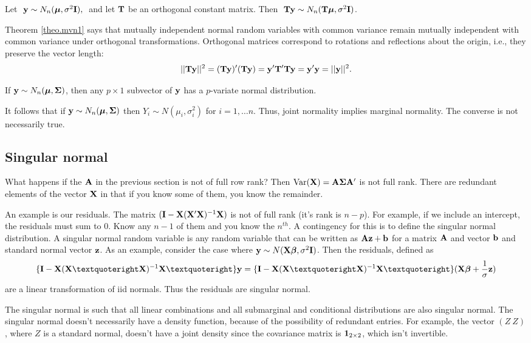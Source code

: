 \bstheo
\label{theo.mvn1}
Let $\ {\bf y}\sim N_n(\mbox{\boldmath $\mu$},\sigma^2 \mathbf{I}),\ $ and let $\mathbf{T}$ be an
orthogonal constant matrix.  Then $\ \mathbf{T}\mathbf{y}\sim
N_n(\mathbf{T}\mbox{\boldmath $\mu$},\sigma^2\mathbf{I})$.
\etheo


Theorem \ref{theo.mvn1} says that mutually independent normal random
variables with common variance remain mutually independent with common
variance under orthogonal transformations.  Orthogonal matrices
correspond to rotations and reflections about the origin, i.e., they
preserve the vector length:
$$||\mathbf{T}\mathbf{y}||^2=(\mathbf{T}\mathbf{y})'(\mathbf{T}\mathbf{y}) =
\mathbf{y}'\mathbf{T}'\mathbf{T}\mathbf{y}=\mathbf{y}'\mathbf{y}=||\mathbf{y}||^2.$$




\vb


\bstheo
If $\mathbf{y} \sim N_n(\mbox{\boldmath $\mu$},\mathbf{\Sigma})$, then any $p \times 1$ subvector of $\mathbf{y}$ has a $p$-variate normal
distribution.
\estheo

It follows that if  $\mathbf{y} \sim N_n(\mbox{\boldmath $\mu$},\mathbf{\Sigma})$ then $Y_i \sim N(\mu_i,\sigma^2_i)$ for $i=1, \ldots n$. Thus, joint normality implies marginal normality. The converse is not necessarily true.

\subsection{Singular normal}


What happens if the $\mathbf{A}$ in the previous section is not of full
row rank? Then $\mbox{Var}(\mathbf{X}) = \mathbf{A}\boldsymbol{\Sigma} \mathbf{A}'$ is not full rank.
There are redundant elements of the vector $\mathbf{X}$ in that if
you know some of them, you know the remainder. 

An example is our residuals. The matrix $(\mathbf{I} - \mathbf{X} (\mathbf{X}'\mathbf{X})^{-1} \mathbf{X})$ is not of full
rank (it's rank is $n-p$). For example, if we include an
intercept, the residuals must sum to 0. Know any $n-1$ of
them and you know the $n^{th}$. A contingency for this
is to define the singular normal distribution. A
singular normal random variable is any random variable
that can be written as $\mathbf{A} \mathbf{z} + \mathbf{b}$ for a matrix $\mathbf{A}$
and vector $\mathbf{b}$ and standard normal vector $\mathbf{z}$. 
As an example, consider the case where $\mathbf{y} \sim N(\mathbf{X} \boldsymbol{\beta}, \sigma^2 \mathbf{I})$.
Then the residuals, defined as 
$$\{\bI - \hatmat\} \by = \{\bI - \hatmat\}(\bX\bbeta + \frac{1}{\sigma} \bz)$$
are a linear transformation of iid normals. Thus the residuals are singular normal. 

The singular normal is such that all linear combinations and all submarginal and conditional distributions
are also singular normal. The singular normal doesn't necessarily
have a density function, because of the possibility of redundant
entries. For example, the vector $(Z ~ Z)$, where $Z$ is a standard normal,
doesn't have a joint density since the covariance matrix is $\mathbf{1}_{2\times 2}$,
which isn't invertible.

